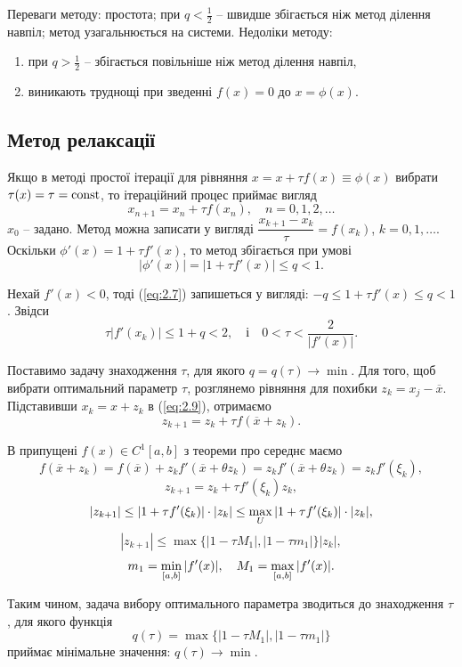 Переваги методу: простота; при $q < \frac12$ -- швидше збігається ніж метод ділення навпіл; метод узагальнюється на системи. Недоліки методу: 
\begin{enumerate}
	\item при $q > \frac12$ -- збігається повільніше ніж метод ділення навпіл,
	\item виникають труднощі при зведенні $f (x) = 0$ до $x =\phi (x)$.
\end{enumerate}


\subsection{Метод релаксації}

Якщо в методі простої ітерації для рівняння $x = x +\tau f (x) \equiv\phi (x)$ вибрати $\tau (x) =\tau = \operatorname{const}$, то ітераційний процес приймає вигляд
\begin{equation}
	\label{eq:2.9}
	x_{n+1} = x_n +\tau f(x_n), \quad n = 0,1,2,\ldots
\end{equation}
$x_0$ -- задано. Метод можна записати у вигляді $\dfrac{x_{k+1}-x_k}{\tau} = f(x_k)$, $k=0,1,\ldots$. Оскільки $\phi'(x) =1+\tau f'(x)$, то метод збігається при умові \[ |\phi'(x)| = |1+\tau f'(x)| \le q < 1.\]

Нехай $f'(x) < 0$, тоді (\ref{eq:2.7}) запишеться у вигляді: $-q \le 1 +\tau f'(x) \le q < 1$. Звідси \[\tau |f'(x_k)| \le 1 + q < 2, \quad \text{і} \quad 0 < \tau < \dfrac{2}{|f'(x)|}. \]

Поставимо задачу знаходження $\tau$, для якого $q = q(\tau) \to \min$. Для того, щоб вибрати оптимальний параметр $\tau$, розглянемо рівняння для похибки $z_k = x_j - \overline{x}$. \\

Підставивши $x_k = x + z_k$ в (\ref{eq:2.9}), отримаємо
\[ z_{k+1} = z_k + \tau f(\overline{x} + z_k).\]

В припущені $f(x)\in C^1 [a,b]$ з теореми про середнє маємо
\[ f(\overline{x} + z_k) = f(\overline{x}) + z_k f'(\overline{x} + \theta z_k) = z_k f'(\overline{x}+\theta z_k) = z_k f'(\xi_k), \]
\[ z_{k+1} = z_k + \tau f'(\xi_k) z_k, \]
\[ |z_{k+1}| \le |1 + \tau f'(\xi_k)| \cdot |z_k| \le \displaystyle\max\limits_U |1 + \tau f'(\xi_k)| \cdot |z_k|, \]
\[ |z_{k+1}| \le \max \{|1-\tau M_1|, |1-\tau m_1| \}|z_k|, \]
\[ m_1 = \displaystyle\min\limits_{[a,b]} |f'(x)|, \quad M_1 = \displaystyle\max\limits_{[a,b]} |f'(x)|. \]

Таким чином, задача вибору оптимального параметра зводиться до знаходження $\tau$, для якого функція \[ q(\tau) = \max\{|1-\tau M_1|,|1-\tau m_1|\}\]
приймає мінімальне значення: $q(\tau)\to\min$.

